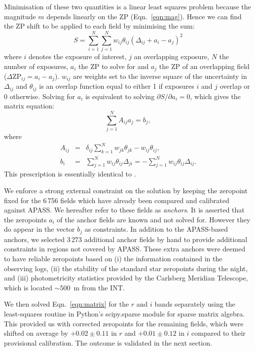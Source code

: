 \documentclass[useAMS,usenatbib]{mn2e}
\begin{document}
Minimisation of these two quantities is a linear least squares problem 
because the magnitude $m$ depends linearly on the ZP (Eqn.~\ref{eqn:mag}).
Hence we can find the ZP shift to be applied to each field 
by minimising the sum:
\begin{equation}
   S = \sum_{i=1}^N \sum_{j=1}^N w_{ij} \theta_{ij} (\Delta_{ij} + a_i - a_j)^2
   \label{eqn:chi2}
\end{equation}
where $i$ denotes the exposure of interest, 
$j$ an overlapping exposure, 
$N$ the number of exposures,
$a_i$ the ZP to solve for 
and $a_j$ the ZP of an overlapping field ($\Delta\mathrm{ZP}_{ij}=a_i-a_j$). 
$w_{ij}$ are weights set to the inverse square of the uncertainty in $\Delta_{ij}$
and $\theta_{ij}$ is an overlap function 
equal to either 1 if exposures $i$ and $j$ overlap or 0 otherwise. 
Solving for $a_i$ is equivalent to solving $\partial
S/\partial a_i=0$, which gives the matrix equation:
\begin{equation}
   \sum_{j=1}^N A_{ij} a_j = b_j,
   \label{eqn:matrix}
\end{equation}
where 
\begin{eqnarray}
   A_{ij} &=& \delta_{ij} \sum_{k=1}^N w_{jk}\theta_{jk} - w_{ij} \theta_{ij},\label{eqn:aij}\\
   b_i &=& \sum_{j=1}^N w_{ij} \theta_{ij}\Delta_{ji} = -\sum_{j=1}^N w_{ij} \theta_{ij}\Delta_{ij}.\label{eqn:bi}
\end{eqnarray}
This prescription is essentially identical to \citet{Glazebrook1994}.

We enforce a strong external constraint
on the solution by keeping the zeropoint fixed 
for the 6\,756 fields which have already been compared
and calibrated against APASS.
We hereafter refer to these fields as \emph{anchors}.
It is asserted that the zeropoints $a_i$ of the anchor fields 
are known and not solved for.  However they do appear in the vector 
$b_j$ as constraints.  In addition to the APASS-based anchors, 
we selected 3\,273 additional anchor fields by hand
to provide additional constraints in regions not covered by APASS.
These extra anchors were deemed to have reliable zeropoints 
based on 
(i) the information contained in the observing logs,
(ii) the stability of the standard star zeropoints during the night, and
(iii) photometricity statistics provided by the Carlsberg Meridian Telescope,
which is located $\sim$500~m from the INT.

We then solved Eqn.~\ref{eqn:matrix} for the $r$ and $i$ bands
separately using the least-squares routine 
in Python's {\sc scipy.sparse} module for sparse matrix algebra.
This provided us with corrected zeropoints for the remaining fields,
which were shifted on average by $+0.02\pm0.11$ in $r$ 
and $+0.01\pm0.12$ in $i$ compared to their provisional calibration.
The outcome is validated in the next section.
\end{document}

